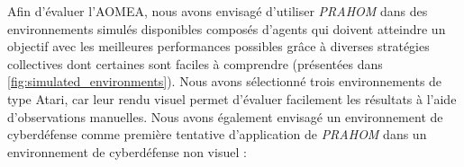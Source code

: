 

Afin d'évaluer l'AOMEA, nous avons envisagé d'utiliser \emph{PRAHOM} dans des environnements simulés disponibles composés d'agents qui doivent atteindre un objectif avec les meilleures performances possibles grâce à diverses stratégies collectives dont certaines sont faciles à comprendre (présentées dans \autoref{fig:simulated_environments}).
Nous avons sélectionné trois environnements de type Atari, car leur rendu visuel permet d'évaluer facilement les résultats à l'aide d'observations manuelles\footnotemark[1].
Nous avons également envisagé un environnement de cyberdéfense comme première tentative d'application de \emph{PRAHOM} dans un environnement de cyberdéfense non visuel :



